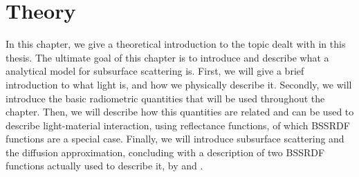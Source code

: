 \chapter{Theory}
\label{chap:theory}

In this chapter, we give a theoretical introduction to the topic dealt with in this thesis. The ultimate goal of this chapter is to introduce and describe what a analytical model for subsurface scattering is. First, we will give a brief introduction to what light is, and how we physically describe it. Secondly, we will introduce the basic radiometric quantities that will be used throughout the chapter. Then, we will describe how this quantities are related and can be used to describe light-material interaction, using reflectance functions, of which BSSRDF functions are a special case. Finally, we will introduce subsurface scattering and the diffusion approximation, concluding with a description of two BSSRDF functions actually used to describe it, by \cite{Jensen:2001:PMS:383259.383319} and \cite{IMM2013-06646}.


